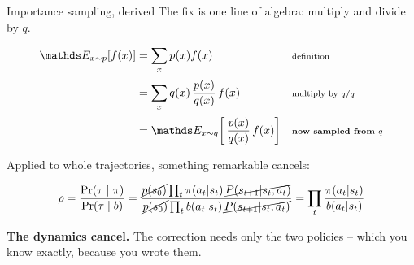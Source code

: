 \documentclass[aspectratio=169]{beamer}
\begin{document}
\begin{frame}{Importance sampling, derived}
  \small
  The fix is one line of algebra: multiply and divide by $q$.

  \vskip 4pt
  \begin{tcolorbox}[colback=lightbg, colframe=popblue, boxrule=0.7pt, arc=2pt]
    \footnotesize
    \begin{align*}
      \E_{x \sim p}[f(x)] &= \sum_x p(x) f(x)
        && \text{\scriptsize definition} \\[2pt]
      &= \sum_x q(x)\, \frac{p(x)}{q(x)}\, f(x)
        && \text{\scriptsize multiply by $q/q$} \\[2pt]
      &= \E_{x \sim q}\!\left[\, \frac{p(x)}{q(x)}\, f(x) \right]
        && \text{\scriptsize \textbf{now sampled from $q$}}
    \end{align*}
  \end{tcolorbox}

  \vskip 4pt
  Applied to whole trajectories, something remarkable cancels:

  \vskip 2pt
  \begin{center}
  \begin{tcolorbox}[colback=paramgreen!8, colframe=paramgreen, boxrule=0.7pt, arc=2pt, width=0.94\textwidth]
    \footnotesize
    \[ \rho = \frac{\Pr(\tau \mid \pi)}{\Pr(\tau \mid b)}
       = \frac{\cancel{p(s_0)} \prod_t \pi(a_t|s_t)\, \cancel{P(s_{t+1}|s_t,a_t)}}
              {\cancel{p(s_0)} \prod_t b(a_t|s_t)\, \cancel{P(s_{t+1}|s_t,a_t)}}
       = \prod_t \frac{\pi(a_t|s_t)}{b(a_t|s_t)} \]
    \vskip -2pt
    \begin{center}
      \textbf{The dynamics cancel.} The correction needs only the two policies -- which you
      know exactly, because you wrote them.
    \end{center}
  \end{tcolorbox}
  \end{center}
\end{frame}
\end{document}
